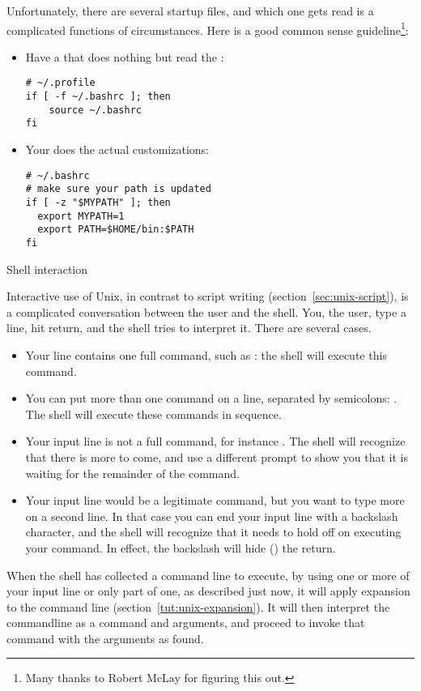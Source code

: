 Unfortunately, there are several startup files, and which one gets read
is a complicated functions of circumstances. Here is a good common sense
guideline\footnote{Many thanks to Robert McLay for figuring this out.}:
\begin{itemize}
\item Have a  that does nothing but read the :
\begin{verbatim}
# ~/.profile
if [ -f ~/.bashrc ]; then
    source ~/.bashrc
fi
\end{verbatim}
\item Your  does the actual customizations:
\begin{verbatim}
# ~/.bashrc
# make sure your path is updated
if [ -z "$MYPATH" ]; then
  export MYPATH=1
  export PATH=$HOME/bin:$PATH
fi
\end{verbatim}
\end{itemize}


 {Shell interaction}

Interactive use of Unix, in contrast to script writing
(section~\ref{sec:unix-script}), is a complicated conversation between
the user and the shell. You, the user, type a line, hit return, and
the shell tries to interpret it. There are several cases.
\begin{itemize}
\item Your line contains one full command, such as : the
  shell will execute this command.
\item You can put more than one command on a line, separated by
  semicolons: . The shell will execute these
  commands in sequence.
\item Your input line is not a full command, for instance . The shell will recognize that there is more to come, and use
  a different prompt to show you that it is waiting for the remainder
  of the command.
\item Your input line would be a legitimate command, but you want to
  type more on a second line. In that case you can end your input line
  with a backslash character, and the shell will recognize that it
  needs to hold off on executing your command. In effect, the
  backslash will hide () the return.
\end{itemize}

When the shell has collected a command line to execute, by using one or
more of your input line or only part of one, as described just now, it
will apply expansion to the command line
(section~\ref{tut:unix-expansion}). It will then interpret the
commandline as a command and arguments, and proceed to invoke that
command with the arguments as found.


